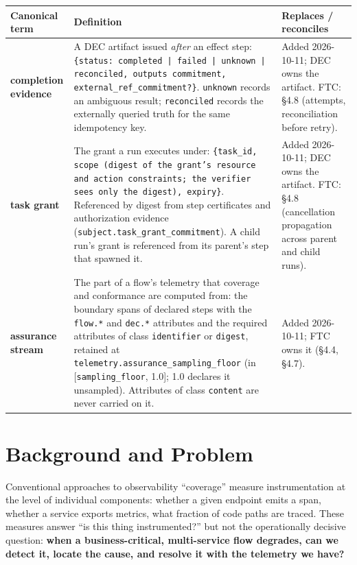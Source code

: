 \documentclass[11pt]{article}
\newcommand{\code}[1]{\texttt{#1}}
\begin{document}
\begin{center}
\footnotesize
\begin{tabular}{@{}p{2.7cm} p{7.1cm} p{5.6cm}@{}}
\toprule
\textbf{Canonical term} & \textbf{Definition} & \textbf{Replaces / reconciles} \\
\midrule
\textbf{completion evidence} & A DEC artifact issued \emph{after} an effect step: \code{\{status: completed | failed | unknown | reconciled, outputs commitment, external\_ref\_commitment?\}}. \code{unknown} records an ambiguous result; \code{reconciled} records the externally queried truth for the same idempotency key. & Added 2026-10-11; DEC owns the artifact. FTC: \S4.8 (attempts, reconciliation before retry). \\
\addlinespace
\textbf{task grant} & The grant a run executes under: \code{\{task\_id, scope (digest of the grant's resource and action constraints; the verifier sees only the digest), expiry\}}. Referenced by digest from step certificates and authorization evidence (\code{subject.task\_grant\_commitment}). A child run's grant is referenced from its parent's step that spawned it. & Added 2026-10-11; DEC owns the artifact. FTC: \S4.8 (cancellation propagation across parent and child runs). \\
\addlinespace
\textbf{assurance stream} & The part of a flow's telemetry that coverage and conformance are computed from: the boundary spans of declared steps with the \code{flow.*} and \code{dec.*} attributes and the required attributes of class \code{identifier} or \code{digest}, retained at \code{telemetry.assurance\_sampling\_floor} (in [\code{sampling\_floor}, 1.0]; 1.0 declares it unsampled). Attributes of class \code{content} are never carried on it. & Added 2026-10-11; FTC owns it (\S4.4, \S4.7). \\
\bottomrule
\end{tabular}
\end{center}

\section{Background and Problem}
Conventional approaches to observability ``coverage'' measure instrumentation at the level of individual components: whether a given endpoint emits a span, whether a service exports metrics, what fraction of code paths are traced. These measures answer ``is this thing instrumented?'' but not the operationally decisive question: \textbf{when a business-critical, multi-service flow degrades, can we detect it, locate the cause, and resolve it with the telemetry we have?}
\end{document}

